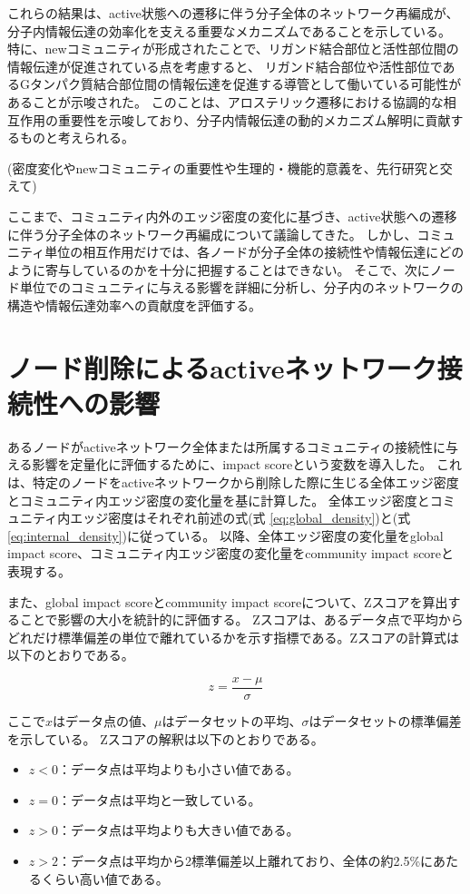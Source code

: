これらの結果は、active状態への遷移に伴う分子全体のネットワーク再編成が、分子内情報伝達の効率化を支える重要なメカニズムであることを示している。
特に、newコミュニティが形成されたことで、リガンド結合部位と活性部位間の情報伝達が促進されている点を考慮すると、
リガンド結合部位や活性部位であるGタンパク質結合部位間の情報伝達を促進する導管として働いている可能性があることが示唆された。
このことは、アロステリック遷移における協調的な相互作用の重要性を示唆しており、分子内情報伝達の動的メカニズム解明に貢献するものと考えられる。

(密度変化やnewコミュニティの重要性や生理的・機能的意義を、先行研究と交えて)

ここまで、コミュニティ内外のエッジ密度の変化に基づき、active状態への遷移に伴う分子全体のネットワーク再編成について議論してきた。
しかし、コミュニティ単位の相互作用だけでは、各ノードが分子全体の接続性や情報伝達にどのように寄与しているのかを十分に把握することはできない。
そこで、次にノード単位でのコミュニティに与える影響を詳細に分析し、分子内のネットワークの構造や情報伝達効率への貢献度を評価する。


\section{ノード削除によるactiveネットワーク接続性への影響}

あるノードがactiveネットワーク全体または所属するコミュニティの接続性に与える影響を定量化に評価するために、impact scoreという変数を導入した。
これは、特定のノードをactiveネットワークから削除した際に生じる全体エッジ密度とコミュニティ内エッジ密度の変化量を基に計算した。
全体エッジ密度とコミュニティ内エッジ密度はそれぞれ前述の式(式 \ref{eq:global_density})と(式 \ref{eq:internal_density})に従っている。
以降、全体エッジ密度の変化量をglobal impact score、コミュニティ内エッジ密度の変化量をcommunity impact scoreと表現する。

また、global impact scoreとcommunity impact scoreについて、Zスコアを算出することで影響の大小を統計的に評価する。
Zスコアは、あるデータ点で平均からどれだけ標準偏差の単位で離れているかを示す指標である。Zスコアの計算式は以下のとおりである。

\begin{equation}
z = \frac{x - \mu}{\sigma}
\end{equation}

ここで$x$はデータ点の値、$\mu$はデータセットの平均、$\sigma$はデータセットの標準偏差を示している。
Zスコアの解釈は以下のとおりである。
\begin{itemize}
    \item \( z < 0 \)：データ点は平均よりも小さい値である。
    \item \( z = 0 \)：データ点は平均と一致している。
    \item \( z > 0 \)：データ点は平均よりも大きい値である。
    \item \( z > 2 \)：データ点は平均から2標準偏差以上離れており、全体の約2.5\%にあたるくらい高い値である。
\end{itemize}

